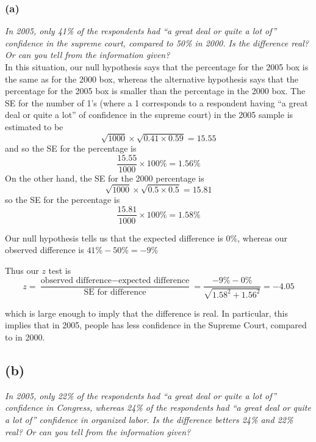 \documentclass[11pt]{article}
\begin{document}
\subsubsection*{(a)}
\noindent \textit{In 2005, only 41\% of the respondents had ``a great deal or quite a lot of'' confidence in the supreme court, compared to 50\% in 2000. Is the difference real? Or can you tell from the information given?}\\

\noindent In this situation, our null hypothesis says that the percentage for the 2005 box is the same as for the 2000 box, whereas the alternative hypothesis says that the percentage for the 2005 box is smaller than the percentage in the 2000 box. The SE for the number of 1's (where a 1 corresponds to a respondent having ``a great deal or quite a lot'' of confidence in the supreme court) in the 2005 sample is estimated to be
$$\sqrt{1000} \times \sqrt{0.41 \times 0.59} = 15.55$$
\noindent and so the SE for the percentage is
$$\frac{15.55}{1000} \times 100\% = 1.56\%$$
\noindent On the other hand, the SE for the 2000 percentage is
$$\sqrt{1000} \times \sqrt{0.5 \times 0.5} = 15.81$$
\noindent so the SE for the percentage is
$$\frac{15.81}{1000} \times 100\% = 1.58\%$$

\noindent Our null hypothesis tells us that the expected difference is $0\%$, whereas our observed difference is $41\% - 50\% = -9\%$

\noindent Thus our $z$ test is
$$z = \frac{\text{observed difference} - \text{expected difference}}{\text{SE for difference}} = \frac{ - 9\% - 0\%}{\sqrt{1.58^2 + 1.56^2}} = -4.05$$

\noindent which is large enough to imply that the difference is real. In particular, this implies that in 2005, people has less confidence in the Supreme Court, compared to in 2000.


\subsection*{(b)}
\noindent \textit{ In 2005, only 22\% of the respondents had ``a great deal or quite a lot of'' confidence in Congress, whereas 24\% of the respondents had ``a great deal or quite a lot of'' confidence in organized labor. Is the difference betters 24\% and 22\% real? Or can you tell from the information given?}\\
 
\end{document}
